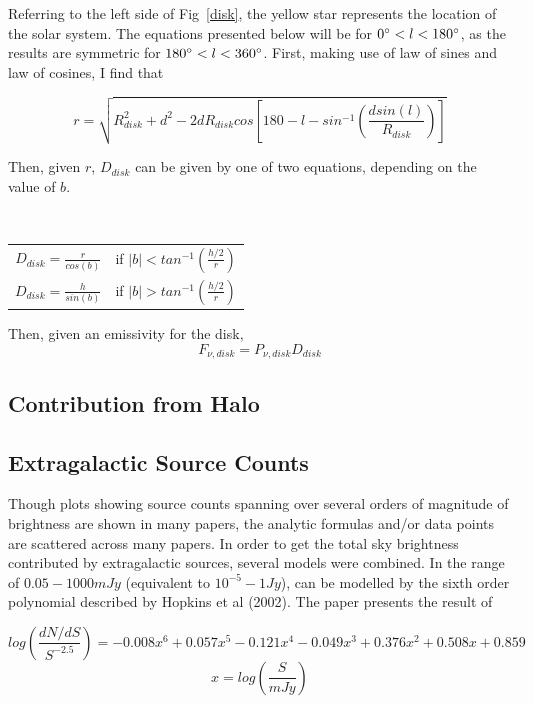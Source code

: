 \documentclass[letterpaper, 10pt]{article}
\begin{document}
Referring to the left side of Fig~\ref{disk}, the yellow star represents the location of the solar system. The equations presented below will be for $ 0\degree < l < 180\degree $, as the results are symmetric for $ 180\degree < l < 360\degree $. First, making use of law of sines and law of cosines, I find that 

\[ r = \sqrt{R_{disk}^{2} + d^{2} - 2dR_{disk}cos\left[180 - l - sin^{-1}\left(\frac{dsin(l)}{R_{disk}}\right)\right]} \]

Then, given $r$, $D_{disk}$ can be given by one of two equations, depending on the value of $b$. 

\begin{table}[h]\
\centering
\begin{tabular}{c c}
$ D_{disk} = \frac{r}{cos(b)} $ & if $|b| < tan^{-1} \left(\frac{h/2}{r} \right)$ \\

$ D_{disk} = \frac{h}{sin(b)} $ & if $|b| > tan^{-1} \left(\frac{h/2}{r} \right)$ \\

\end{tabular}
\end{table}

Then, given an emissivity for the disk, 
\[F_{\nu, disk} = P_{\nu, disk}D_{disk} \]

\subsection{Contribution from Halo}


\subsection{Extragalactic Source Counts}

Though plots showing source counts spanning over several orders of magnitude of brightness are shown in many papers, the analytic formulas and/or data points are scattered across many papers. In order to get the total sky brightness contributed by extragalactic sources, several models were combined. In the range of $0.05 - 1000 mJy$ (equivalent to $10^{-5} - 1 Jy$), can be modelled by the sixth order polynomial described by Hopkins et al (2002). The paper presents the result of 

\[ log\left(\frac{dN/dS}{S^{-2.5}}\right) = -0.008x^{6} + 0.057x^{5} - 0.121x^{4} - 0.049x^{3} + 0.376x^{2} + 0.508x + 0.859 \] \[x = log\left(\frac{S}{mJy}\right) \]
\end{document}
